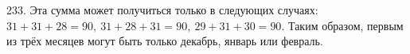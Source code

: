 233. Эта сумма может получиться только в следующих случаях: $31+31+28=90,\ 31+28+31=90,\ 29+31+30=90.$ Таким образом, первым из трёх месяцев могут быть только декабрь, январь или февраль.\\
